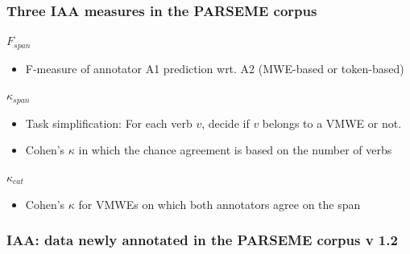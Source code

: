 \documentclass[xcolor=dvipsnames]{beamer}
\begin{document}
\begin{frame}
\begin{frame}[label={iaa}]
\begin{scriptsize}
\end{scriptsize}

\end{frame}


\begin{frame}[label={iaa}]
  \vspace*{-5pt}
  \frametitle{Three IAA measures in the PARSEME corpus}


\begin{block}{$F_{span}$}
\begin{itemize}
\item F-measure of annotator A1 prediction wrt. A2 (MWE-based or token-based)
\end{itemize}
\end{block}

\begin{block}{$\kappa_{span}$}
\begin{itemize}
\item Task simplification: For each verb $v$, decide if $v$ belongs to a VMWE or not.
\item Cohen's $\kappa$ in which the chance agreement is based on the number of verbs
\end{itemize}
\end{block}

\begin{block}{$\kappa_{cat}$}
\begin{itemize}
\item Cohen's $\kappa$ for VMWEs on which both annotators agree on the span
\end{itemize}
\end{block}


\end{frame}

\begin{frame}[label={iaa}]
  \vspace*{-5pt}
  \frametitle{IAA: data newly annotated in the PARSEME corpus v 1.2}
  

\end{frame}
\end{frame}
\end{document}
